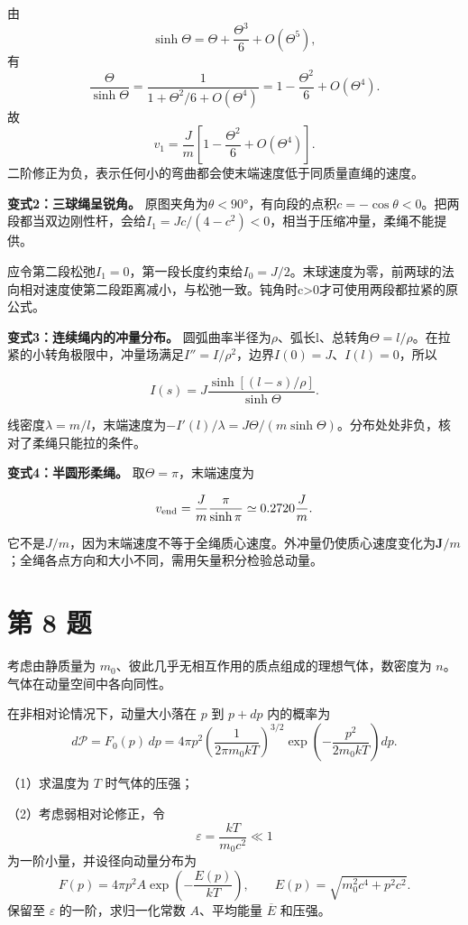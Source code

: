 \documentclass[12pt,a4paper,UTF8]{ctexart}
\begin{document}
由 \[
\sinh\Theta
=\Theta+\frac{\Theta^3}{6}+O(\Theta^5),
\] 有 \[
\frac{\Theta}{\sinh\Theta}
=\frac1{1+\Theta^2/6+O(\Theta^4)}
=1-\frac{\Theta^2}{6}+O(\Theta^4).
\] 故 \[
\boxed{
v_1=\frac Jm
\left[
1-\frac{\Theta^2}{6}+O(\Theta^4)
\right]
}.
\] 二阶修正为负，表示任何小的弯曲都会使末端速度低于同质量直绳的速度。

\textbf{变式2：三球绳呈锐角。}
原图夹角为\(\theta<90°\)，有向段的点积\(c=-\cos\theta<0\)。把两段都当双边刚性杆，会给\(I_1=Jc/(4-c^2)<0\)，相当于压缩冲量，柔绳不能提供。

应令第二段松弛\(I_1=0\)，第一段长度约束给\(I_0=J/2\)。末球速度为零，前两球的法向相对速度使第二段距离减小，与松弛一致。钝角时c\textgreater0才可使用两段都拉紧的原公式。

\textbf{变式3：连续绳内的冲量分布。}
圆弧曲率半径为\(\rho\)、弧长l、总转角\(\Theta=l/\rho\)。在拉紧的小转角极限中，冲量场满足\(I''=I/\rho^2\)，边界\(I(0)=J\)、\(I(l)=0\)，所以

\[I(s)=J\frac{\sinh[(l-s)/\rho]}{\sinh\Theta}.\]

线密度\(\lambda=m/l\)，末端速度为\(-I'(l)/\lambda=J\Theta/(m\sinh\Theta)\)。分布处处非负，核对了柔绳只能拉的条件。

\textbf{变式4：半圆形柔绳。} 取\(\Theta=\pi\)，末端速度为

\[v_{\rm end}=\frac Jm\frac\pi{\sinh\pi}\simeq0.2720\frac Jm.\]

它不是\(J/m\)，因为末端速度不等于全绳质心速度。外冲量仍使质心速度变化为\(\boldsymbol J/m\)；全绳各点方向和大小不同，需用矢量积分检验总动量。

\newpage

\section{第 8 题}\label{ux7b2c-8-ux9898}

考虑由静质量为 \(m_0\)、彼此几乎无相互作用的质点组成的理想气体，数密度为
\(n\)。气体在动量空间中各向同性。

在非相对论情况下，动量大小落在 \(p\) 到 \(p+dp\) 内的概率为 \[
d\mathcal P
=F_0(p)\,dp
=4\pi p^2
\left(\frac1{2\pi m_0kT}\right)^{3/2}
\exp\left(-\frac{p^2}{2m_0kT}\right)dp.
\]

（1）求温度为 \(T\) 时气体的压强；

（2）考虑弱相对论修正，令 \[
\varepsilon=\frac{kT}{m_0c^2}\ll1
\] 为一阶小量，并设径向动量分布为 \[
F(p)=4\pi p^2A\exp\left(-\frac{E(p)}{kT}\right),
\qquad
E(p)=\sqrt{m_0^2c^4+p^2c^2}.
\] 保留至 \(\varepsilon\) 的一阶，求归一化常数 \(A\)、平均能量
\(\overline E\) 和压强。
\end{document}
